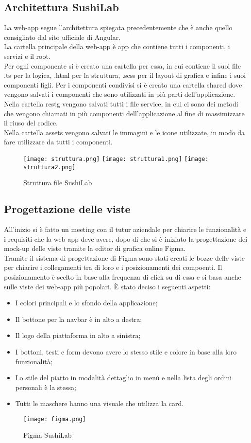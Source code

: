 \subsection{Architettura SushiLab}
La web-app segue l'architettura spiegata precedentemente che è anche quello consigliato dal sito ufficiale di Angular.\\
La cartella principale della web-app è app che contiene tutti i componenti, i servizi e il root.\\ 
Per ogni componente si è creato una cartella per essa, in cui contiene il suoi file .ts per la logica, .html per la struttura, .scss per il layout di grafica e infine i suoi componenti figli. Per i componenti condivisi si è creato una cartella shared dove vengono salvati i componenti che sono utilizzati in più parti dell'applicazione.\\
Nella cartella \gls{restg} vengono salvati tutti i file service, in cui ci sono dei metodi che vengono chiamati in più componenti dell'applicazione al fine di massimizzare il riuso del codice.\\
Nella cartella assets vengono salvati le immagini e le icone utilizzate, in modo da fare utilizzare da tutti i componenti.\\
\begin{figure}[H]
    \centering
    \texttt{[image: struttura.png]}
    \texttt{[image: struttura1.png]}
    \texttt{[image: struttura2.png]}
    \caption{Struttura file SushiLab}
\end{figure}
\subsection{Progettazione delle viste}
All'inizio si è fatto un meeting con il tutur aziendale per chiarire le funzionalità e i requisiti che la web-app deve avere, dopo di che si è iniziato la progettazione dei mock-up delle viste tramite la editor di grafica online Figma.\\
Tramite il sistema di progettazione di Figma sono stati creati le bozze delle viste per chiarire i collegamenti tra di loro e i posizionamenti dei compoenti. 
Il posizionamento è scelto in base alla frequenza di click su di essa e si basa anche sulle viste dei web-app più popolari.
È stato deciso i seguenti aspetti:
\begin{itemize}
    \item I colori principali e lo sfondo della applicazione;
    \item Il bottone per la navbar è in alto a destra;
    \item Il logo della piattaforma in alto a sinistra;
    \item I bottoni, testi e form devono avere lo stesso stile e colore in base alla loro funzionalità;
    \item Lo stile del piatto in modalità dettaglio in menù e nella lista degli ordini personali è la stessa;
    \item Tutti le maschere hanno una visuale che utilizza la card.
\end{itemize}
\begin{figure}[H]
    \centering
    \texttt{[image: figma.png]}
    \caption{Figma SushiLab}
\end{figure}
